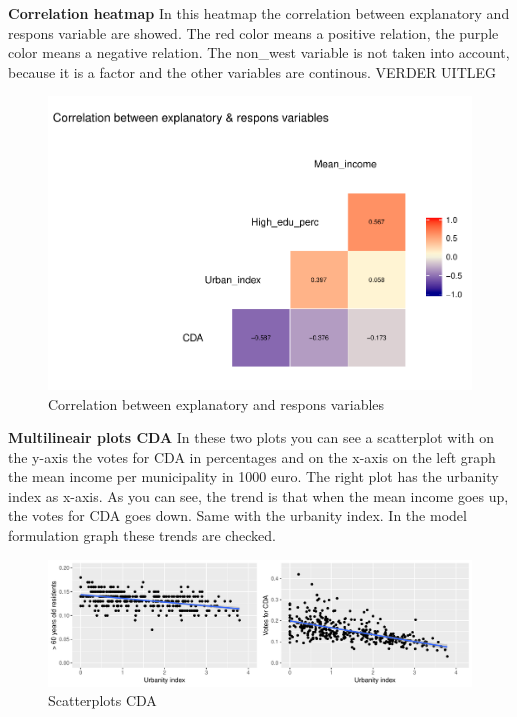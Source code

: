 \documentclass[11pt,]{article}
\begin{document}
\textbf{Correlation heatmap} In this heatmap the correlation between
explanatory and respons variable are showed. The red color means a
positive relation, the purple color means a negative relation. The
non\_west variable is not taken into account, because it is a factor and
the other variables are continous. VERDER UITLEG

\begin{figure}

{\centering \includegraphics{Report_files/figure-latex/correlation_heatmap-1} 

}

\caption{Correlation between explanatory and respons variables}\label{fig:correlation_heatmap}
\end{figure}

\textbf{Multilineair plots CDA } In these two plots you can see a
scatterplot with on the y-axis the votes for CDA in percentages and on
the x-axis on the left graph the mean income per municipality in 1000
euro. The right plot has the urbanity index as x-axis. As you can see,
the trend is that when the mean income goes up, the votes for CDA goes
down. Same with the urbanity index. In the model formulation graph these
trends are checked.

\begin{figure}

{\centering \includegraphics{Report_files/figure-latex/unnamed-chunk-5-1} 

}

\caption{Scatterplots CDA}\label{fig:unnamed-chunk-5}
\end{figure}
\end{document}

